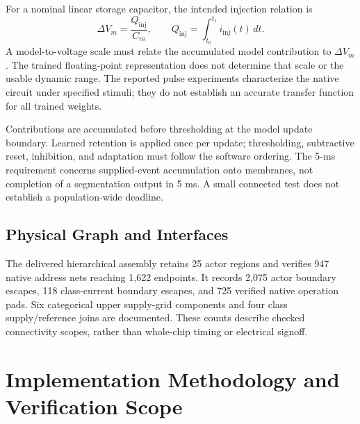 \documentclass[preprint,12pt,number]{elsarticle}
\begin{document}
For a nominal linear storage capacitor, the intended injection relation is
\begin{equation}
\Delta V_m=\frac{Q_{\mathrm{inj}}}{C_m},\qquad
Q_{\mathrm{inj}}=\int_{t_0}^{t_1}i_{\mathrm{inj}}(t)\,dt.
\end{equation}
A model-to-voltage scale must relate the accumulated model contribution to $\Delta V_m$. The trained floating-point representation does not determine that scale or the usable dynamic range. The reported pulse experiments characterize the native circuit under specified stimuli; they do not establish an accurate transfer function for all trained weights.

Contributions are accumulated before thresholding at the model update boundary. Learned retention is applied once per update; thresholding, subtractive reset, inhibition, and adaptation must follow the software ordering. The 5-ms requirement concerns supplied-event accumulation onto membranes, not completion of a segmentation output in 5 ms. A small connected test does not establish a population-wide deadline.

\subsection{Physical Graph and Interfaces}
The delivered hierarchical assembly retains 25 actor regions and verifies 947 native address nets reaching 1,622 endpoints. It records 2,075 actor boundary escapes, 118 class-current boundary escapes, and 725 verified native operation pads. Six categorical upper supply-grid components and four class supply/reference joins are documented. These counts describe checked connectivity scopes, rather than whole-chip timing or electrical signoff.

\section{Implementation Methodology and Verification Scope}
\label{sec:verification}
\end{document}
